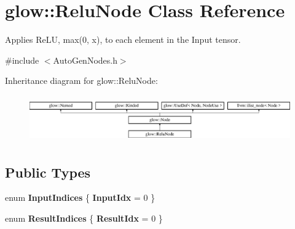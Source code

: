 \hypertarget{classglow_1_1_relu_node}{}\section{glow\+:\+:Relu\+Node Class Reference}
\label{classglow_1_1_relu_node}


Applies Re\+LU, max(0, x), to each element in the Input tensor.  




{\ttfamily \#include $<$Auto\+Gen\+Nodes.\+h$>$}

Inheritance diagram for glow\+:\+:Relu\+Node\+:\begin{figure}[H]
\begin{center}
\leavevmode
\includegraphics[height=2.028986cm]{classglow_1_1_relu_node}
\end{center}
\end{figure}
\subsection*{Public Types}
\begin{DoxyCompactItemize}
\item 
\mbox{\label{classglow_1_1_relu_node_a3a69d255091c31626c999513482a242d}} 
enum {\bfseries Input\+Indices} \{ {\bfseries Input\+Idx} = 0
 \}
\item 
\mbox{\label{classglow_1_1_relu_node_a69c3629e596e392c9dce1e6e94d35f8a}} 
enum {\bfseries Result\+Indices} \{ {\bfseries Result\+Idx} = 0
 \}
\end{DoxyCompactItemize}
